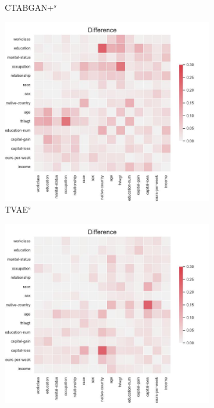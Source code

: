 \begin{figure}[h]
\begin{subfigure}{0.3\textwidth}
		\caption{CTABGAN+$^s$}
	\end{subfigure}
    \begin{subfigure}{0.3\textwidth}
        \includegraphics[width=\textwidth]{images/correlation_difference/tvae_simTune.jpg}
        \caption{TVAE$^s$}
    \end{subfigure}
	\begin{subfigure}{0.3\textwidth}
		\includegraphics[width=\textwidth]{images/correlation_difference/tab-ddpm-bgm-simTune.jpg}

\end{subfigure}
\end{figure}
